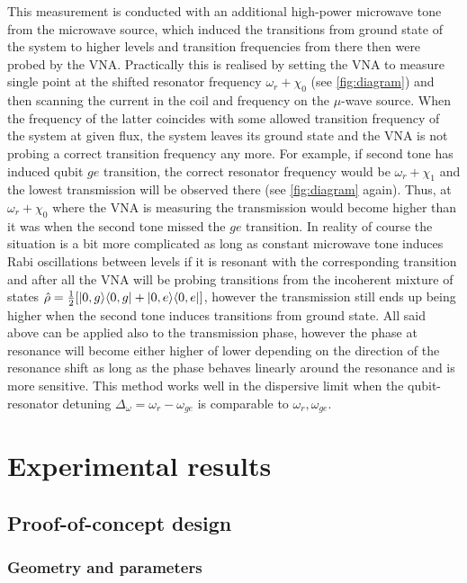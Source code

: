 \documentclass[12pt, twoside]{report}
\DeclarePairedDelimiter\bra{\langle}{\rvert}
\DeclarePairedDelimiter\ket{\lvert}{\rangle}
\numberwithin{equation}{section}
\begin{document}
This measurement is conducted with an additional high-power microwave tone from the microwave source, which induced the transitions from ground state of the system to higher levels and transition frequencies from there then were probed by the VNA. Practically this is realised by setting the VNA to measure single point at the shifted resonator  frequency $\omega_r + \chi_0$ (see \autoref{fig:diagram}) and then scanning the current in the coil and frequency on the $\mu$-wave source. When the frequency of the latter coincides with some allowed transition frequency of the system at given flux, the system leaves its ground state and the VNA is not probing a correct transition frequency any more. For example, if second tone has induced qubit $ge$ transition, the correct resonator frequency would be $\omega_r + \chi_1$ and the lowest transmission will be observed there (see \autoref{fig:diagram} again). Thus, at $\omega_r + \chi_0$ where the VNA is measuring the transmission would become higher than it was when the second tone missed the $ge$ transition. In reality of course the situation is a bit more complicated as long as constant microwave tone induces Rabi oscillations between levels if it is resonant with the corresponding transition and after all the VNA will be probing transitions from the incoherent mixture of states $\hat \rho = \frac{1}{2} [\ket{0, g}\bra{0,g} + \ket{0, e}\bra{0,e}]$, however the transmission still ends up being higher when the second tone induces transitions from ground state. All said above can be applied also to the transmission phase, however the phase at resonance will become either higher of lower depending on the direction of the resonance shift as long as the phase behaves linearly around the resonance and is more sensitive. This method works well in the dispersive limit when the qubit-resonator detuning $\Delta_\omega = \omega_r - \omega_{ge}$ is comparable to $\omega_r, \omega_{ge}$.

\chapter{Experimental results}

\section{Proof-of-concept design}

\subsection{Geometry and parameters}
\end{document}

